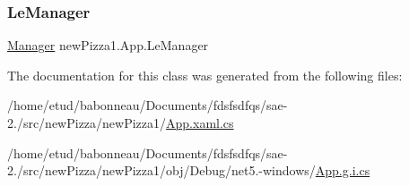 \subsubsection{\texorpdfstring{Le\+Manager}{LeManager}}
{\footnotesize\ttfamily \hyperlink{classModele_1_1Manager}{Manager} new\+Pizza1.\+App.\+Le\+Manager\hspace{0.3cm}{\ttfamily [get]}}



The documentation for this class was generated from the following files\+:\begin{DoxyCompactItemize}
\item 
/home/etud/babonneau/\+Documents/fdsfsdfqs/sae-\/2./src/new\+Pizza/new\+Pizza1/\hyperlink{newPizza1_2App_8xaml_8cs}{App.\+xaml.\+cs}\item 
/home/etud/babonneau/\+Documents/fdsfsdfqs/sae-\/2./src/new\+Pizza/new\+Pizza1/obj/\+Debug/net5.-\/windows/\hyperlink{net5_80-windows_2App_8g_8i_8cs}{App.\+g.\+i.\+cs}\end{DoxyCompactItemize}
